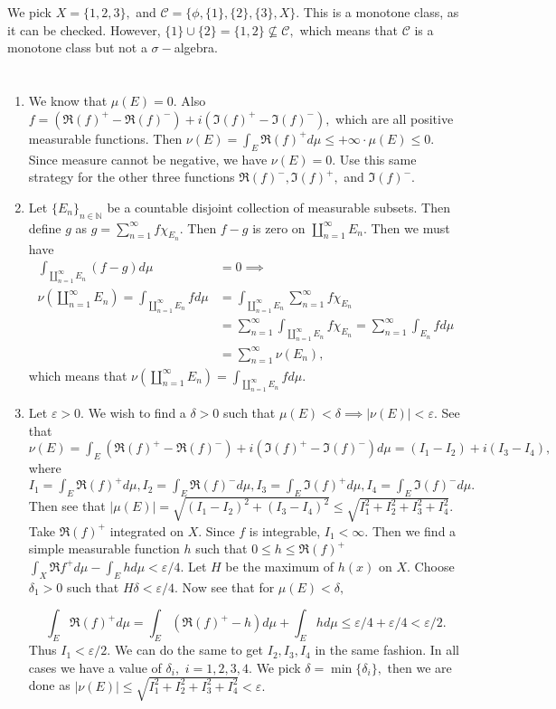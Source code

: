 \documentclass{article}
\begin{document}
\section{} %
We pick $X=\{1,2,3\},$ and $\mathcal{C}=\{\phi, \{1\},\{2\},\{3\},X\}.$ This is a monotone class, as it can be checked. However, $\{1\}\cup \{2\}=\{1,2\} \nsubseteq \mathcal{C},$ which means that $\mathcal{C}$ is a monotone class but not a $\sigma-$algebra.
\section{} \label{Prob6} %
\begin{enumerate}
	\item We know that $\mu(E)=0.$ Also $f= (\Re (f)^+ - \Re (f)^-)+i(\Im (f)^+ - \Im (f)^-),$ which are all positive measurable functions. Then $\nu(E)=\int_E \Re (f)^+ d\mu \leq +\infty \cdot \mu(E) \leq 0.$ Since measure cannot be negative, we have $\nu(E)=0.$ Use this same strategy for the other three functions $\Re (f)^-,\Im (f)^+,$ and $ \Im (f)^-.$
	\item Let $\{E_n\}_{n \in \mathbb{N}}$ be a countable disjoint collection of measurable subsets. Then define $g$ as $g= \sum_{n=1}^{\infty}f\chi_{E_n}.$ Then $f-g$ is zero on $\coprod_{n=1}^{\infty} E_n.$ Then we must have  
	\begin{align*}
		\int_{\coprod_{n=1}^{\infty}E_n}(f-g) d\mu&=0 \implies \\ \nu(\coprod_{n=1}^{\infty}E_n) =\int_{\coprod_{n=1}^{\infty}E_n}f d\mu &= \int_{\coprod_{n=1}^{\infty}E_n} \sum_{n=1}^{\infty} f\chi_{E_n}\\
		&=\sum_{n=1}^{\infty} \int_{\coprod_{n=1}^{\infty}E_n} f\chi_{E_n}=\sum_{n=1}^{\infty} \int_{E_n}f d\mu\\
		&= \sum_{n=1}^{\infty} \nu(E_n),
	\end{align*} which means that $\nu(\coprod_{n=1}^{\infty}E_n)=\int_{\coprod_{n=1}^{\infty}E_n}f d\mu.$
	\item Let $\varepsilon>0.$ We wish to find a $\delta >0$ such that $\mu(E)<\delta \implies |\nu(E)|<\varepsilon.$ See that $\nu(E)=\int_E (\Re (f)^+ - \Re (f)^-)+i(\Im (f)^+ - \Im (f)^-) d\mu= (I_1-I_2)+i(I_3-I_4),$ where $I_1=\int_{E}\Re(f)^+d\mu , I_2=\int_{E}\Re(f)^-d\mu , I_3=\int_{E}\Im(f)^+d\mu ,I_4=\int_{E}\Im(f)^-d\mu.$ Then see that $|\mu(E)|= \sqrt{(I_1-I_2)^2 + (I_3-I_4)^2}\leq \sqrt{I_1^2+I_2^2+I_3^2+I_4^2}.$ Take $\Re(f)^+$ integrated on $X$. Since $f$ is integrable, $I_1 < \infty.$ Then we find a simple measurable function $h$ such that $0 \leq h \leq \Re(f)^+$ $\int_X \Re f^+ d\mu - \int_E h d\mu < \varepsilon/4.$ Let $H$ be the maximum of $h(x)$ on $X.$ Choose $\delta_1 > 0$ such that $H\delta < \varepsilon/4.$ Now see that for $\mu(E)<\delta,$ 
	
	$$\int_E \Re(f)^+ d\mu = \int_E (\Re(f)^+-h) d\mu + \int_E h d\mu \leq \varepsilon/4+\varepsilon/4 < \varepsilon/2.$$
	Thus $I_1< \varepsilon/2.$ We can do the same to get $I_2,I_3, I_4$ in the same fashion. In all cases we have a value of $\delta_i,$ $i=1,2,3,4.$ We pick $\delta= \min\{\delta_i\},$ then we are done as $|\nu(E)|\leq \sqrt{I_1^2+I_2^2+I_3^2+I_4^2} < \varepsilon.$  
\end{enumerate}
\end{document}
